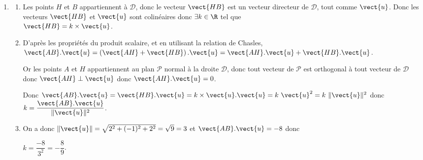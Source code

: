 \begin{enumerate}
\begin{enumerate}
$2 + 4t  - 2 + t + 4 + 4t = 0 \iff 9t + 1= 0\iff t = -\dfrac{1}{9}$.\\
	On remplace la valeur de $t$ dans les trois dernières équations :\\
		$\left\{\begin{array}{l c l} x&=&1+2\times-\dfrac{1}{9}=\dfrac{7}{9} \\y &=& 2 - \left(-\dfrac{1}{9}\right)=\dfrac{19}{9}\\z&=& 2+2 \times \left(-\dfrac{1}{9}\right) =\dfrac{16}{9} \end{array}\right.$. Donc $H\left(\dfrac79~;~\dfrac{19}{9}~;~\dfrac{16}{9}\right)$.
		\item Déterminons les coordonnées de $\vect{AH}$ avec $A(-1~;~1~;~3)$ et $H\left(\dfrac79~;~\dfrac{19}{9}~;~\dfrac{16}{9}\right)$ : .

Donc $\left\| \vect{AH}\right\| =\sqrt{\left(\dfrac{16}{9}\right)^2+\left(\dfrac{10}{9}\right)^2+\left(-\dfrac{11}{9}\right)^2}=\dfrac{\sqrt{477}}{9}=\dfrac{\sqrt{53}}{3}$
\end{enumerate}
\item 
\begin{enumerate}
	\item Les points $H$ et $B$ appartiennent à $\mathcal{D}$, donc le vecteur $\vect{HB}$ est un vecteur directeur de $\mathcal{D}$, tout comme $\vect{u}$. Donc les vecteurs $\vect{HB}$ et $\vect{u}$ sont colinéaires donc $\exists k \in \R$ tel que \\$\vect{HB}=k\times \vect{u}$.
	\item D'après les propriétés du produit scalaire, et en utilisant la relation de Chasles, \\ $\vect{AB}.\vect{u}=\left(\vect{AH}+\vect{HB}\right).\vect{u}=\vect{AH}.\vect{u}+ \vect{HB}.\vect{u}$.
	
Or les points $A$ et $H$ appartiennent au plan $\mathcal{P}$ normal à la droite $\mathcal{D}$, donc tout vecteur de $\mathcal{P}$ est orthogonal à tout vecteur de $\mathcal{D}$ donc $\vect{AH}\perp \vect{u}$ donc $\vect{AH}.\vect{u}=0$.

Donc $\vect{AB}.\vect{u}=\vect{HB}.\vect{u} = k \times \vect{u}.\vect{u}=k~\vect{u}^2=k~\lVert\vect{u}\rVert^2$ donc $k=\dfrac{\vect{AB}.\vect{u}}{\lVert\vect{u}\rVert^2}$.
	\item On a  donc $\lVert\vect{u}\rVert=\sqrt{2^2+(-1)^2+2^2}=\sqrt{9}=3$ et $\vect{AB}.\vect{u}=-8$ donc 
	
$k=\dfrac{-8}{3^2}=-\dfrac{8}{9}$.


\end{enumerate}
\end{enumerate}
